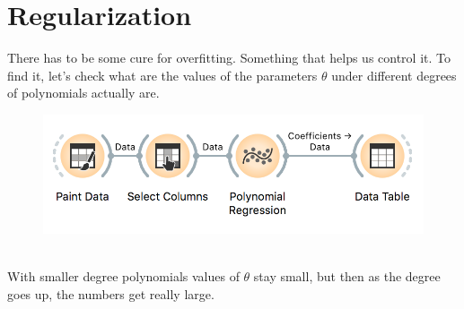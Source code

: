 \chapter{Regularization}
\label{ch:regularization}

There has to be some cure for overfitting. Something that helps us control it. To find it, let's check what are the values of the parameters $\theta$ under different degrees of polynomials actually are.

\begin{figure}[h]
    \centering
    \includegraphics[scale=0.6]{workflow-overfitting.png}
    \caption{$\;$}
\end{figure}

With smaller degree polynomials values of $\theta$ stay small, but then as the degree goes up, the numbers get really large.

